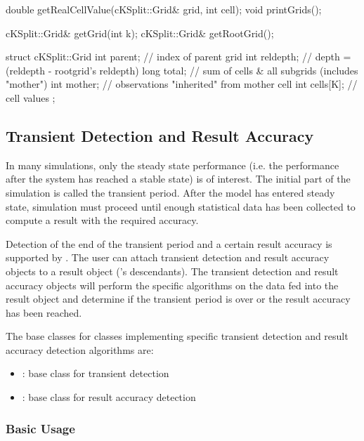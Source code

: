 \begin{cpp}
double getRealCellValue(cKSplit::Grid& grid, int cell);
void printGrids();
\end{cpp}

\begin{cpp}
cKSplit::Grid& getGrid(int k);
cKSplit::Grid& getRootGrid();
\end{cpp}

\begin{cpp}
struct cKSplit::Grid
{
  int parent;   // index of parent grid
  int reldepth; // depth = (reldepth - rootgrid's reldepth)
  long total;   // sum of cells & all subgrids (includes "mother")
  int mother;   // observations "inherited" from mother cell
  int cells[K]; // cell values
};
\end{cpp}



\subsection{Transient Detection and Result Accuracy}

In many simulations, only the steady state performance (i.e.
the performance after the system has reached a stable state)
is of interest. The initial part of the simulation is called
the transient period. After the model has entered steady state,
simulation must proceed until enough statistical data has been
collected to compute a result with the required accuracy.


Detection of the end of the transient period and a certain result
accuracy is supported by {\opp}. The user can attach transient
detection and result accuracy objects to a result object ('s
descendants). The transient detection and result accuracy objects will
perform the specific algorithms on the data fed into the result object and
determine if the transient period is over or the result accuracy has been
reached.

The base classes for classes implementing specific transient
detection and result accuracy detection algorithms are:
\begin{itemize}
\item{: base class for transient detection}
\item{: base class for result accuracy detection}
\end{itemize}


\subsubsection{Basic Usage}

